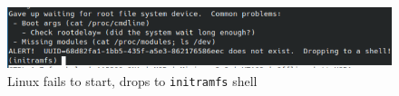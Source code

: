 \begin{figure}[h!]
    \centering
    \includegraphics[width=\textwidth]{img/initramfs_shell.png}
    \caption{Linux fails to start, drops to \texttt{initramfs} shell}
    \label{fig:linux_initramfs}
\end{figure}